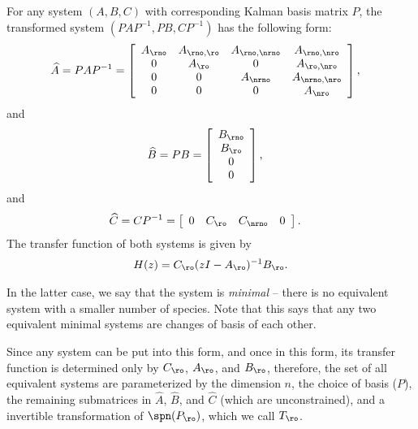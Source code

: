 \begin{theorem} \label{thm:kalman}
        For any system $(A,B,C)$ with corresponding Kalman basis matrix $P$,
        the transformed system $(PAP^{-1},PB,CP^{-1})$  has the following form:
        \begin{align*}
            \widehat A = PAP^{-1}
            &=
            \left[ \begin{array}{cccc}
                A_{\rno} & A_{\rno,\ro} & A_{\rno,\nrno} & A_{\rno,\nro} \\
                0 & A_{\ro} & 0 & A_{\ro,\nro} \\
                0 & 0 & A_{\nrno} & A_{\nrno,\nro} \\
                0 & 0 & 0 & A_{\nro}
            \end{array} \right] ,
        \end{align*}
        and
        \begin{align*}
            \widehat B = PB
            &=
            \left[ \begin{array}{cccc}
                B_{\rno} \\
                B_{\ro} \\
                0 \\
                0 
            \end{array} \right] ,
        \end{align*}
        and
        \begin{align*}
            \widehat C = CP^{-1}
            &=
            \left[ \begin{array}{cccc}
                0 & C_{\ro} & C_{\nrno} & 0 
            \end{array} \right] .
        \end{align*}
        The transfer function of both systems is given by
        \begin{align*}
            H(z) = C_{\ro} ( zI - A_{\ro} )^{-1} B_{\ro} .
        \end{align*}
\end{theorem}

In the latter case, we say that the system is \emph{minimal} 
-- there is no equivalent system with a smaller number of species.
Note that this says that any two equivalent minimal systems
are changes of basis of each other.

Since any system can be put into this form,
and once in this form, its transfer function is determined only by 
$C_{\ro}$, $A_{\ro}$, and $B_\ro$,
therefore, the set of all equivalent systems are parameterized by
the dimension $n$,
the choice of basis ($P$),
the remaining submatrices in $\widehat A$, $\widehat B$, and $\widehat C$
(which are unconstrained),
and a invertible transformation of $\spn(P_{\ro})$, which we call $T_\ro$.

